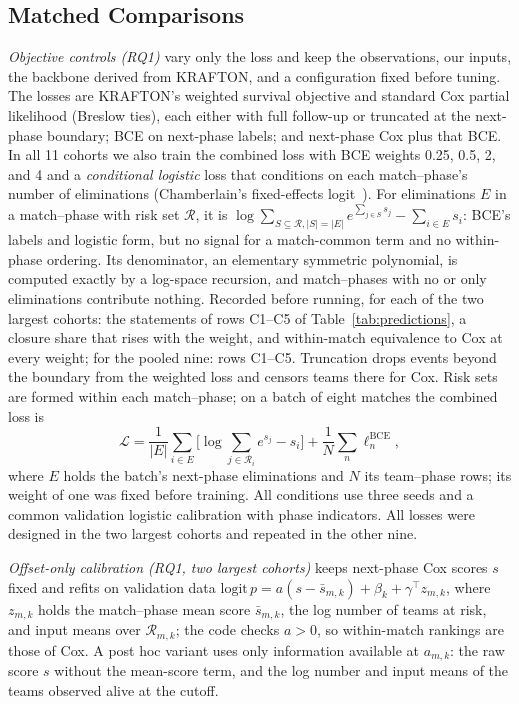 \documentclass[sigconf,anonymous]{acmart}
\begin{document}
\subsection{Matched Comparisons}
\label{sec:method:decomposition}
\emph{Objective controls (RQ1)} vary only the loss and keep the observations, our inputs, the backbone derived from KRAFTON, and a configuration fixed before tuning. The losses are KRAFTON's weighted survival objective and standard Cox partial likelihood (Breslow ties), each either with full follow-up or truncated at the next-phase boundary; BCE on next-phase labels; and next-phase Cox plus that BCE. In all 11 cohorts we also train the combined loss with BCE weights 0.25, 0.5, 2, and 4 and a \emph{conditional logistic} loss that conditions on each match--phase's number of eliminations (Chamberlain's fixed-effects logit~\cite{Chamberlain80}). For eliminations $E$ in a match--phase with risk set $\mathcal{R}$, it is $\log\sum_{S\subseteq\mathcal{R},|S|=|E|}e^{\sum_{j\in S}s_j}-\sum_{i\in E}s_i$: BCE's labels and logistic form, but no signal for a match-common term and no within-phase ordering. Its denominator, an elementary symmetric polynomial, is computed exactly by a log-space recursion, and match--phases with no or only eliminations contribute nothing. Recorded before running, for each of the two largest cohorts: the statements of rows C1--C5 of Table~\ref{tab:predictions}, a closure share that rises with the weight, and within-match equivalence to Cox at every weight; for the pooled nine: rows C1--C5. Truncation drops events beyond the boundary from the weighted loss and censors teams there for Cox. Risk sets are formed within each match--phase; on a batch of eight matches the combined loss is
\begin{equation}
\mathcal{L}=\frac{1}{|E|}\sum_{i\in E}\Big[\log\sum_{j\in\mathcal{R}_i}e^{s_j}-s_i\Big]+\frac{1}{N}\sum_{n}\ell^{\mathrm{BCE}}_n,
\label{eq:combined}
\end{equation}
where $E$ holds the batch's next-phase eliminations and $N$ its team--phase rows; its weight of one was fixed before training. All conditions use three seeds and a common validation logistic calibration with phase indicators. All losses were designed in the two largest cohorts and repeated in the other nine.

\emph{Offset-only calibration (RQ1, two largest cohorts)} keeps next-phase Cox scores $s$ fixed and refits on validation data $\mathrm{logit}\,p=a(s-\bar s_{m,k})+\beta_k+\gamma^{\top}z_{m,k}$, where $z_{m,k}$ holds the match--phase mean score $\bar s_{m,k}$, the log number of teams at risk, and input means over $\mathcal{R}_{m,k}$; the code checks $a>0$, so within-match rankings are those of Cox. A post hoc variant uses only information available at $a_{m,k}$: the raw score $s$ without the mean-score term, and the log number and input means of the teams observed alive at the cutoff.
\end{document}
